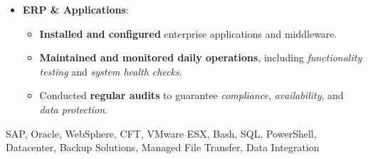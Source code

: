 \begin{experiences}
{\begin{itemize}[left=0pt,label={},itemsep=0.5em]
\begin{itemize}[itemsep=0.2em,topsep=0.2em,parsep=0pt]
              \item Ensured \textbf{system reliability} and \textbf{data protection} for ERP and non-ERP applications \emph{(SAP, Oracle, Documentum)}.
              \item Performed \textbf{quarterly audits} to ensure \emph{data compliance, availability, and security}.
              \item Conducted \textbf{capacity planning and security reviews} in collaboration with infrastructure teams.
              \item Authored \textbf{technical documentation and operational procedures}, improving process standardization.
              \item Trained and supported offshore teams \emph{(Morocco, India)} in incident management and system monitoring.
            \end{itemize}

          \item \textbf{ERP \& Applications}:
            \begin{itemize}[itemsep=0.2em,topsep=0.2em,parsep=0pt]
              \small
              \item \textbf{Installed and configured} enterprise applications and middleware.  
              \item \textbf{Maintained and monitored daily operations}, including \emph{functionality testing} and \emph{system health checks}.  
              \item Conducted \textbf{regular audits} to guarantee \emph{compliance}, \emph{availability}, and \emph{data protection}.
            \end{itemize}
        \end{itemize}
        \vspace{0.5em}  %
    }
    {SAP, Oracle, WebSphere, CFT, VMware ESX, Bash, SQL, PowerShell, Datacenter, Backup Solutions, Managed File Transfer, Data Integration}

\emptySeparator
\end{experiences}
